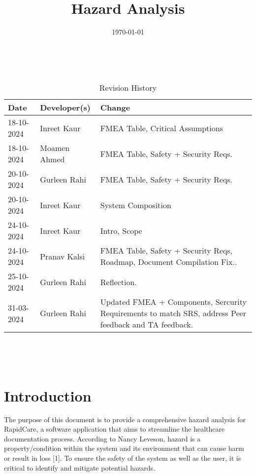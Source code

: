 \documentclass{article}
\title{Hazard Analysis\\\progname}
\author{\authname}
\date{\today}
\begin{document}
\maketitle
\thispagestyle{empty}

~\newpage


\begin{table}[hp]
\caption{Revision History} \label{TblRevisionHistory}
\begin{tabularx}{\textwidth}{llX}
\toprule
\textbf{Date} & \textbf{Developer(s)} & \textbf{Change}\\
\midrule
18-10-2024 & Inreet Kaur & FMEA Table, Critical Assumptions\\
18-10-2024 & Moamen Ahmed & FMEA Table, Safety + Security Reqs.\\
20-10-2024 & Gurleen Rahi & FMEA Table, Safety + Security Reqs.\\
20-10-2024 & Inreet Kaur & System Composition\\
24-10-2024 & Inreet Kaur & Intro, Scope\\
24-10-2024 & Pranav Kalsi & FMEA Table, Safety + Security Reqs, Roadmap, Document Compilation Fix..\\
25-10-2024 & Gurleen Rahi & Reflection.\\
31-03-2024 & Gurleen Rahi & Updated FMEA + Components, Sercurity Requirements to match SRS, address Peer feedback and TA feedback. \\
\bottomrule
\end{tabularx}
\end{table}

~\newpage

\tableofcontents

~\newpage



\section{Introduction}

The purpose of this document is to provide a comprehensive hazard analysis for RapidCare, a software application that aims to streamline the healthcare documentation process. According to Nancy Leveson, hazard is a property/condition within the system and its environment that can cause harm or result in loss [1]. To ensure the safety of the system as well as the user, it is critical to identify and mitigate potential hazards.
\end{document}
